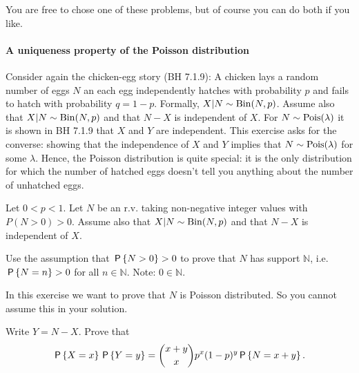 \documentclass[assignments]{subfiles}
\begin{document}
You are free to chose one of these problems, but of course you can do both if you like.

\paragraph{A uniqueness property of the Poisson distribution}

Consider again the chicken-egg story (BH 7.1.9): A chicken lays a random number of eggs $N$ an each egg independently hatches with probability $p$ and fails to hatch with probability $q = 1-p$.
Formally, $X|N\sim\Bin{N,p}$.
Assume also that $X|N\sim\Bin{N,p}$ and that $N-X$ is independent of $X$.
For $N \sim \Pois{\lambda}$ it is shown in BH 7.1.9 that $X$ and $Y$ are independent.
This exercise asks for the converse: showing that the independence of $X$ and $Y$ implies that $N \sim \Pois{\lambda}$ for some $\lambda$.
Hence, the Poisson distribution is quite special: it is the only distribution for which the number of hatched eggs doesn't tell you anything about the number of unhatched eggs.

Let $0 < p < 1$. Let $N$ be an r.v. taking non-negative integer values with $P(N > 0) > 0$.
Assume also that  $X|N\sim\Bin{N,p}$ and that $N-X$ is independent of $X$.

\begin{exercise}
 Use the assumption that $\P{N>0}>0$ to prove that $N$ has support $\mathbb N$, i.e. $\P{N=n} > 0$ for all $n \in \mathbb N$. Note: $0 \in \mathbb N$.
\begin{hint}
In this exercise we want to prove that $N$ is Poisson distributed. So you cannot assume this in your solution.
\end{hint}
\end{exercise}

\begin{exercise}
Write $Y = N-X$. Prove that
\begin{equation}
\label{eq:1}
\P{X=x}\P{Y=y} = {x+y \choose x} p^x (1-p)^y \P{N=x+y}.
\end{equation}
\end{exercise}
\end{document}

